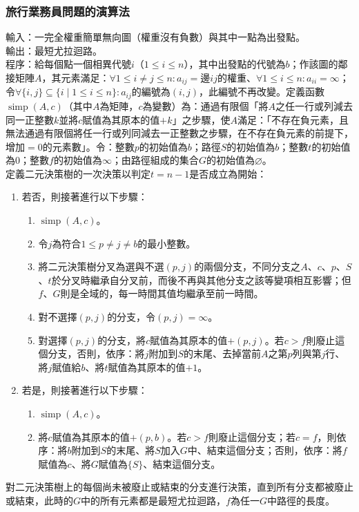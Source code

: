 \documentclass[a4paper,12pt]{report}
\begin{document}
\subsubsection{旅行業務員問題的演算法}
輸入：一完全權重簡單無向圖（權重沒有負數）與其中一點為出發點。 \\
輸出：最短尤拉迴路。 \\
程序：給每個點一個相異代號$i$（$1\leq i\leq n$），其中出發點的代號為$b$；作該圖的鄰接矩陣$A$，其元素滿足：$\forall 1\leq i\neq j\leq n: a_{i j}=$邊$ij$的權重、$\forall 1\leq i\leq n: a_{i i}=\infty$；令$\forall \{i, j\}\subseteq \{i\mid 1\leq i\leq n\}: a_{i j}$的編號為$(i, j)$，此編號不再改變。定義函數$\operatorname{simp}(A, c)$（其中$A$為矩陣，$c$為變數）為：通過有限個「將$A$之任一行或列減去同一正整數$k$並將$c$賦值為其原本的值$+k$」之步驟，使$A$滿足：「不存在負元素，且無法通過有限個將任一行或列同減去一正整數之步驟，在不存在負元素的前提下，增加$=0$的元素數」。令：整數$p$的初始值為$b$；路徑$S$的初始值為$b$；整數$t$的初始值為$0$；整數$f$的初始值為$\infty$；由路徑組成的集合$G$的初始值為$\varnothing$。 \\
定義二元決策樹的一次決策以判定$t=n-1$是否成立為開始：
\begin{enumerate}[label=(\arabic*)]
\item 若否，則接著進行以下步驟：
\begin{enumerate}[label=\tc{\arabic*}]
\item $\operatorname{simp}(A, c)$。
\item 令$j$為符合$1\leq p\neq j\neq b$的最小整數。
\item 將二元決策樹分叉為選與不選$(p, j)$的兩個分支，不同分支之$A$、$c$、$p$、$S$、$t$於分叉時繼承自分叉前，而後不再與其他分支之該等變項相互影響；但$f$、$G$則是全域的，每一時間其值均繼承至前一時間。
\item 對不選擇$(p, j)$的分支，令$(p, j)=\infty$。
\item 對選擇$(p, j)$的分支，將$c$賦值為其原本的值$+(p, j)$。若$c > f$則廢止這個分支，否則，依序：將$j$附加到$S$的末尾、去掉當前$A$之第$p$列與第$j$行、將$j$賦值給$b$、將$t$賦值為其原本的值$+1$。
\end{enumerate}
\item 若是，則接著進行以下步驟：
\begin{enumerate}[label=\tc{\arabic*}]
\item $\operatorname{simp}(A, c)$。
\item 將$c$賦值為其原本的值$+(p, b)$。若$c > f$則廢止這個分支；若$c = f$，則依序：將$b$附加到$S$的末尾、將$S$加入$G$中、結束這個分支；否則，依序：將$f$賦值為$c$、將$G$賦值為$\{S\}$、結束這個分支。
\end{enumerate}
\end{enumerate}
對二元決策樹上的每個尚未被廢止或結束的分支進行決策，直到所有分支都被廢止或結束，此時的$G$中的所有元素都是最短尤拉迴路，$f$為任一$G$中路徑的長度。
\end{document}
